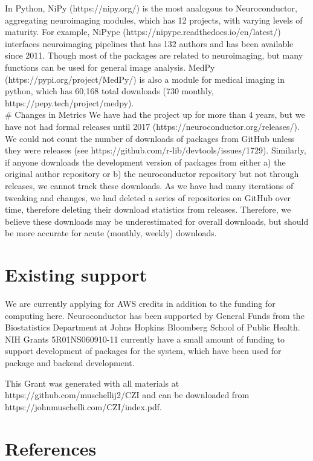 \documentclass[]{elsarticle} %
\begin{document}
In Python, NiPy (https://nipy.org/) is the most analogous to Neuroconductor, aggregating neuroimaging modules, which has 12 projects, with varying levels of maturity. For example, NiPype (https://nipype.readthedocs.io/en/latest/) interfaces neuroimaging pipelines that has 132 authors and has been available since 2011. Though most of the packages are related to neuroimaging, but many functions can be used for general image analysis. MedPy (https://pypi.org/project/MedPy/) is also a module for medical imaging in python, which has 60,168 total downloads (730 monthly, https://pepy.tech/project/medpy).\\
\# Changes in Metrics
We have had the project up for more than 4 years, but we have not had formal releases until 2017 (https://neuroconductor.org/releases/). We could not count the number of downloads of packages from GitHub unless they were releases (see https://github.com/r-lib/devtools/issues/1729). Similarly, if anyone downloads the development version of packages from either a) the original author repository or b) the neuroconductor repository but not through releases, we cannot track these downloads. As we have had many iterations of tweaking and changes, we had deleted a series of repositories on GitHub over time, therefore deleting their download statistics from releases. Therefore, we believe these downloads may be underestimated for overall downloads, but should be more accurate for acute (monthly, weekly) downloads.

\hypertarget{existing-support}{%
\section{Existing support}\label{existing-support}}

We are currently applying for AWS credits in addition to the funding for computing here. Neuroconductor has been supported by General Funds from the Biostatistics Department at Johns Hopkins Bloomberg School of Public Health. NIH Grants 5R01NS060910-11 currently have a small amount of funding to support development of packages for the system, which have been used for package and backend development.

This Grant was generated with all materials at https://github.com/muschellij2/CZI and can be downloaded from https://johnmuschelli.com/CZI/index.pdf.

\hypertarget{references}{%
\section*{References}\label{references}}
\end{document}
